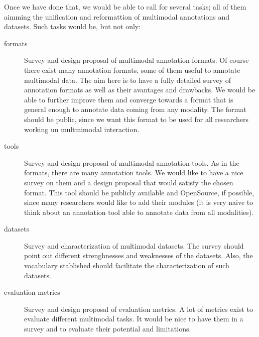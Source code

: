 \documentclass{article}
\begin{document}
Once we have done that, we would be able to call for several tasks; all of them aimming the unification and
reformattion of multimodal annotations and datasets. Such tasks would be, but not only:
\begin{description}
 \item [formats] Survey and design proposal of multimodal annotation formats. Of course there exist many
annotation formats, some of them useful to annotate multimodal data. The aim here is to have a fully detailed survey of
annotation formats as well as their avantages and drawbacks. We would be able to further improve them and converge
towards a format that is general enough to annotate data coming from any modality. The format should be public, since
we want this format to be used for all researchers working un multmimodal interaction.

 \item [tools] Survey and design proposal of multimodal annotation tools. As in the formats, there are many annotation
tools. We would like to have a nice survey on them and a design proposal that would satisfy the chosen format. This
tool should be publicly available and OpenSource, if possible, since many researchers would like to add their modules
(it is very naive to think about an annotation tool able to annotate data from all modalities).

 \item [datasets] Survey and characterization of multimodal datasets. The survey should point out different
strenghnesses and weaknesses of the datasets. Also, the vocabulary stablished should facilitate the characterization of
such datasets.

 \item [evaluation metrics] Survey and design proposal of evaluation metrics. A lot of metrics exist to evaluate
different multimodal tasks. It would be nice to have them in a survey and to evaluate their potential and limitations.
\end{description}
\end{document}
